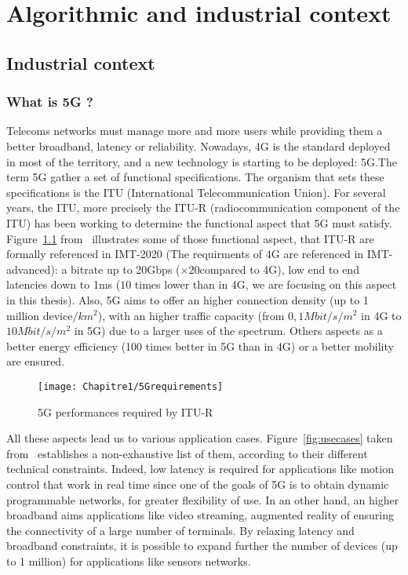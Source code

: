 
\chapter{Algorithmic and industrial context}
\label{chap:context}
\minitoc

\section{Industrial context}
\subsection{What is 5G ?}



Telecoms networks must manage more and more users while providing them a better broadband, latency or reliability. Nowadays, 4G is the standard deployed in most of the territory, and a new technology is starting to be deployed: 5G.The term 5G gather a set of functional specifications. The organism that sets these specifications is the ITU (International Telecommunication Union). For several years, the ITU, more precisely the ITU-R (radiocommunication component of the ITU) has been working to determine the functional aspect that 5G must satisfy. Figure~\ref{fig:5gperf} from~\cite{dahlman20185g} illustrates some of those functional aspect, that ITU-R are formally referenced in IMT-2020 (The requirments of 4G are referenced in IMT-advanced): a bitrate up to 20Gbps ($\times 20 $compared to 4G), low end to end latencies down to 1ms ($10$ times lower than in 4G, we are focusing on this aspect in this thesis).
Also, 5G aims to offer an higher connection density (up to 1 million device$/km^2$), with an higher traffic capacity (from $0,1 Mbit/s/m^2$ in 4G to $10 Mbit/s/m^2$ in 5G) due to a larger uses of the spectrum. Others aspects as a better energy efficiency (100 times better in 5G than in 4G) or a better mobility are ensured. 

  \begin{figure}[h]
      \begin{center}
      \texttt{[image: Chapitre1/5Grequirements]}
      \end{center}
      \caption{5G performances required by ITU-R}\label{fig:5gperf}
      \end{figure}

All these aspects lead us to various application cases. Figure~\ref{fig:usecases} taken from~\cite{5GACIA} establishes a non-exhaustive list of them, according to their different technical constraints. Indeed, low latency is required for applications like motion control that work in real time since one of the goals of 5G is to obtain dynamic programmable networks, for greater flexibility of use.
 In an other hand, an higher broadband aims applications like video streaming, augmented reality of ensuring the connectivity of a large number of terminals.
By relaxing latency and broadband constraints, it is possible to expand further the number of devices (up to 1 million) for applications like sensors networks.

